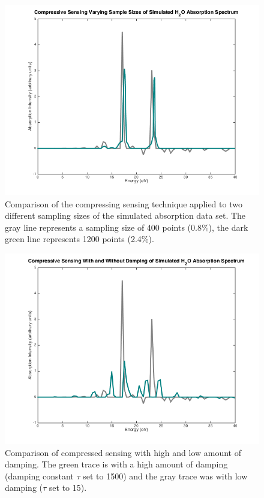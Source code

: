 \documentclass[11pt]{article}
\begin{document}
\begin{figure}[H]
\includegraphics[scale = 0.6]{CS_comp.png}
\caption{Comparison of the compressing sensing technique applied to two different sampling sizes of the simulated absorption data set. The gray line represents a sampling size of 400 points (0.8\%), the dark green line represents 1200 points (2.4\%).}
\label{fig:CScomp}
\end{figure}

\begin{figure}[H]
\includegraphics[scale = 0.6]{wandwodamping.png}
\caption{Comparison of compressed sensing with high and low amount of damping. The green trace is with a high amount of damping (damping constant $\tau$ set to 1500) and the gray trace was with low damping ($\tau$ set to 15).}
\end{figure}
\end{document}
